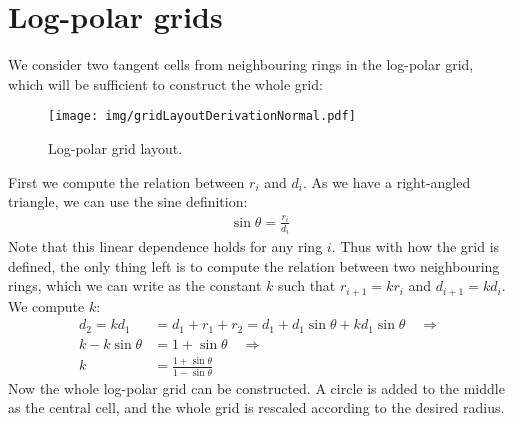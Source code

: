 \documentclass[thesis.tex]{subfiles}
\begin{document}
\section{Log-polar grids}
%
We consider two tangent cells from neighbouring rings in the log-polar grid, which will be sufficient to construct the whole grid:
%
\begin{figure}[H]
	\centering
	\texttt{[image: img/gridLayoutDerivationNormal.pdf]}
   	\caption{Log-polar grid layout.}
  	\label{fig:gridLayoutDerivationNormal}
\end{figure}
\noindent
%
First we compute the relation between $r_i$ and $d_i$. As we have a right-angled triangle, we can use the sine definition:
%
\begin{align}
\sin \theta = \frac{r_i}{d_i}
\label{eq:radiusDistanceRelation}
\end{align}
%
Note that this linear dependence holds for any ring $i$. Thus with how the grid is defined, the only thing left is to compute the relation between two neighbouring rings, which we can write as the constant $k$ such that $r_{i+1} = k r_i$ and $d_{i+1} = k d_i$. We compute $k$:
%
\begin{align*}
d_2 = k d_1 &= d_1 + r_1 + r_2 = d_1 + d_1 \sin \theta + k d_1 \sin \theta \quad\Rightarrow \\
k - k \sin \theta &= 1 + \sin \theta \quad\Rightarrow \\
k &= \frac{1 + \sin \theta}{1 - \sin \theta}
\end{align*}
%
Now the whole log-polar grid can be constructed. A circle is added to the middle as the central cell, and the whole grid is rescaled according to the desired radius.
%
\end{document}
